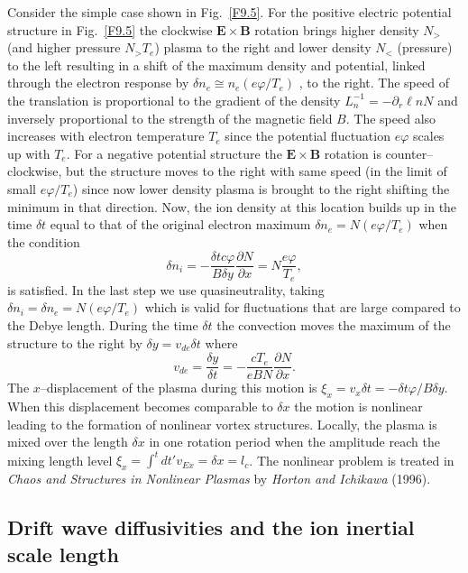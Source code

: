 \documentclass[a4paper,openany,12pt]{book}
\begin{document}
Consider the simple case shown in Fig.~\ref{F9.5}. For the positive electric potential structure in Fig.~\ref{F9.5} the clockwise $\bm{E\times B}$ rotation brings higher density $N_>$ (and higher pressure $N_>T_e$) plasma to the right and lower density $N_{<}$ (pressure) to the left resulting in a shift of the maximum density and potential, linked through the electron response by $\delta n_e\cong n_e(e\varphi/T_e)$ , to the right. The speed of the translation is proportional to the gradient of the density $L_n^{-1}=-\partial_r\ell nN$ and inversely proportional to the strength of the magnetic field $B$. The speed also increases with electron temperature $T_e$ since the potential fluctuation $ e\varphi$ scales up with $T_e$. For a negative potential structure the $\bm{E\times B}$ rotation is counter--clockwise, but the structure moves to the right with same speed (in the limit of small $e\varphi/T_e$) since now lower density plasma is brought to the right shifting the minimum in that direction. Now, the ion density at this location builds up in the time $\delta t$ equal to that of the original electron maximum $\delta n_e=N(e\varphi/T_e)$ when the condition
\begin{equation}
\delta n_i=-\frac{\delta tc\varphi}{B\delta y}\frac{\partial N}{\partial x}=N\frac{e\varphi}{T_e},
\label{E9.5}
\end{equation}
is satisfied. In the last step we use quasineutrality, taking $\delta n_i=\delta n_e=N(e\varphi/T_e)$ which is valid for fluctuations that are large compared to the Debye length. During the time $\delta t$ the convection moves the maximum of the structure to the right by $\delta y=v_{de}\delta t$ where
\begin{equation}
v_{de}=\frac{\delta y}{\delta t}=-\frac{cT_e}{eBN}\frac{\partial N}{\partial x}.\label{E9.6}
\end{equation}
%
The $x$--displacement of the plasma during this motion is $\xi_x=v_x\delta t=-\delta t\varphi/B\delta y$. When this displacement becomes comparable to $\delta x$ the motion is nonlinear leading to the formation of nonlinear vortex structures. Locally, the plasma is mixed over the length $\delta x$ in one rotation period when the amplitude reach the mixing length level $\xi_x=\int^t dt'v_{Ex}=\delta x=l_c$. The nonlinear problem is treated in \emph{Chaos and Structures in Nonlinear Plasmas} by \emph{Horton and Ichikawa} (1996).

\subsection{Drift wave diffusivities and the ion inertial scale length}
\end{document}
